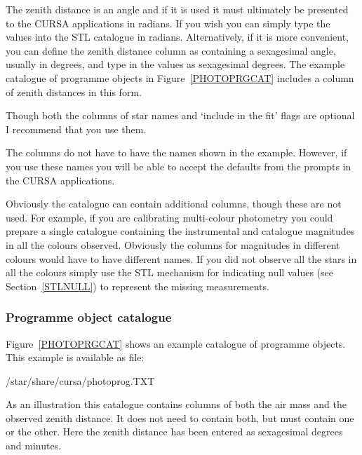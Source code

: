 \documentclass[twoside,11pt]{starlink}
\begin{document}
The zenith distance is an angle and if it is used it must ultimately
be presented to the CURSA applications in radians.  If you wish you
can simply type the values into the STL catalogue in radians.
Alternatively, if it is more convenient, you can define the zenith
distance column as containing a sexagesimal angle, usually in degrees,
and type in the values as sexagesimal degrees.  The example catalogue
of programme objects in Figure~\ref{PHOTOPRGCAT} includes a column of
zenith distances in this form.

Though both the columns of star names and `include in the fit' flags
are optional I recommend that you use them.

The columns do not have to have the names shown in the example.
However, if you use these names you will be able to accept the defaults
from the prompts in the CURSA applications.

Obviously the catalogue can contain additional columns, though these
are not used.  For example, if you are calibrating multi-colour photometry
you could prepare a single catalogue containing the instrumental and
catalogue magnitudes in all the colours observed.  Obviously the
columns for magnitudes in different colours would have to have different
names.  If you did not observe all the stars in all the colours simply
use the STL mechanism for indicating null values (see
Section~\ref{STLNULL}) to represent the missing measurements.

\subsubsection{Programme object catalogue}

Figure~\ref{PHOTOPRGCAT} shows an example catalogue of programme
objects.  This example is available as file:

\begin{terminalv}
/star/share/cursa/photoprog.TXT
\end{terminalv}

As an illustration this catalogue contains columns of both the air mass
and the observed zenith distance.  It does not need to contain both,
but must contain one or the other.  Here the zenith distance has been
entered as sexagesimal degrees and minutes.
\end{document}
